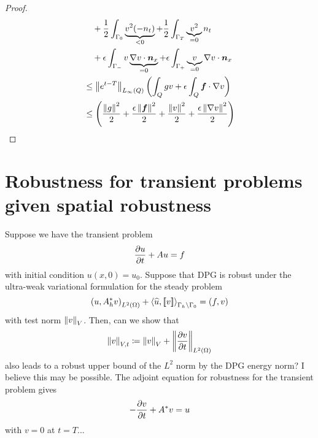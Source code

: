\documentclass{article}
\begin{document}
\begin{proof}
\begin{align*}
&\quad+\frac{1}{2}\int_{\Gamma_0} \underbrace{v^2 (-n_t)}_{<0}
+\frac{1}{2}\int_{\Gamma_T} \underbrace{v^2}_{=0} n_t\\
&\quad+\epsilon\int_{\Gamma_-} v\underbrace{\nabla v\cdot\boldsymbol n_x}_{=0}
+\epsilon\int_{\Gamma_+} \underbrace{v}_{=0}\nabla v\cdot\boldsymbol n_x
\\
&\leq \left\| e^{t-T} \right\|_{L_\infty(Q)}\left( \int_Qgv+\epsilon\int_Q\boldsymbol f\cdot\nabla v \right)
\\
&\leq \left( \frac{\left\| g \right\|^2}{2}+\frac{\epsilon\left\| \boldsymbol f \right\|^2}{2}+\frac{\left\| v \right\|^2}{2}+\frac{\epsilon\left\| \nabla v \right\|^2}{2} \right)
\\
\end{align*}
\end{proof}


\section{Robustness for transient problems given spatial robustness}

Suppose we have the transient problem
\[
\frac{\partial u}{\partial t} + Au = f
\]
with initial condition $u(x,0) = u_0$.  Suppose that DPG is robust under the ultra-weak variational formulation for the steady problem
\[
\left( u,A^*_h v \right)_{L^2\left( \Omega \right)} + \left\langle \widehat{u}, \left[ \![v]\! \right] \right\rangle_{\Gamma_h\setminus \Gamma_0} = \left( f,v \right)
\]
with test norm $\left\| v \right\|_{V}$.  Then, can we show that 
\[
\left\| v \right\|_{V,t} \coloneqq \left\| v \right\|_V + \left\| \frac{\partial v}{\partial t} \right\|_{L^2\left( \Omega \right)}
\]
also leads to a robust upper bound of the $L^2$ norm by the DPG energy norm?  I believe this may be possible.  The adjoint equation for robustness for the transient problem gives
\[
-\frac{\partial v}{\partial t} + A^*v = u
\]
with $v = 0$ at $t=T$...  
\end{document}
